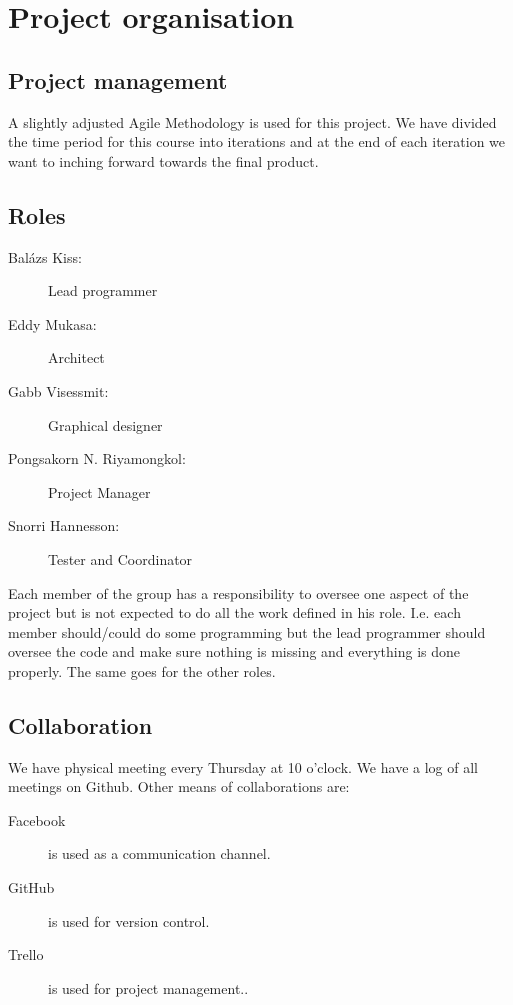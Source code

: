 \documentclass[11pt]{article}
\begin{document}

\section{Project organisation}
\subsection{Project management}
A slightly adjusted Agile Methodology is used for this project. We have divided the time period for this course into iterations and at the end of each iteration we want to inching forward towards the final product.

\subsection{Roles}

\begin{description}
\item[Balázs Kiss:] Lead programmer
\item[Eddy Mukasa:] Architect
\item[Gabb Visessmit:] Graphical designer
\item[Pongsakorn N. Riyamongkol:] Project Manager
\item[Snorri Hannesson:] Tester and Coordinator
\end{description}

Each member of the group has a responsibility to oversee one aspect of the project but is not expected to do all the work defined in his role. I.e. each member should/could do some programming but the lead programmer should oversee the code and make sure nothing is missing and everything is done properly. The same goes for the other roles.

\subsection{Collaboration}
We have physical meeting every Thursday at 10 o'clock. We have a log of all meetings on Github. Other means of collaborations are:
\begin{description}
\item[Facebook] is used as a communication channel.
\item[GitHub] is used for version control.
\item[Trello] is used for project management..
\end{description}
\end{document}
